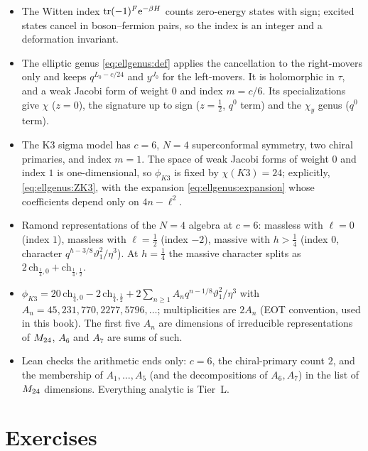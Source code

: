 \begin{summarybox}
\begin{itemize}[leftmargin=1.2em,itemsep=1pt]
\item The Witten index $\operatorname{tr}(-1)^F\mathrm{e}^{-\beta H}$ counts zero-energy states with sign; excited
 states cancel in boson--fermion pairs, so the index is an integer and a deformation
 invariant.
\item The elliptic genus \eqref{eq:ellgenus:def} applies the cancellation to the
 right-movers only and keeps $q^{L_0-c/24}$ and $y^{J_0}$ for the left-movers. It is
 holomorphic in $\tau$, and a weak Jacobi form of weight $0$ and index $m=c/6$. Its
 specializations give $\chi$ ($z=0$), the signature up to sign ($z=\tfrac12$, $q^0$ term) and
 the $\chi_y$ genus ($q^0$ term).
\item The K3 sigma model has $c=6$, $N=4$ superconformal symmetry, two chiral primaries, and
 index $m=1$. The space of weak Jacobi forms of weight $0$ and index $1$ is one-dimensional,
 so $\phi_{K3}$ is fixed by $\chi(K3)=24$; explicitly, \eqref{eq:ellgenus:ZK3}, with the
 expansion \eqref{eq:ellgenus:expansion} whose coefficients depend only on $4n-\ell^2$.
\item Ramond representations of the $N=4$ algebra at $c=6$: massless with $\ell=0$ (index
 $1$), massless with $\ell=\tfrac12$ (index $-2$), massive with $h>\tfrac14$ (index $0$,
 character $q^{h-3/8}\vartheta_1^2/\eta^3$). At $h=\tfrac14$ the massive character splits as
 $2\,\mathrm{ch}_{\frac14,0}+\mathrm{ch}_{\frac14,\frac12}$.
\item $\phi_{K3}=20\,\mathrm{ch}_{\frac14,0}-2\,\mathrm{ch}_{\frac14,\frac12}
 +2\sum_{n\ge1}A_nq^{n-1/8}\vartheta_1^2/\eta^3$ with $A_n=45,231,770,2277,5796,\dots$;
 multiplicities are $2A_n$ (EOT convention, used in this book). The first five $A_n$ are
 dimensions of irreducible representations of $M_{24}$, $A_6$ and $A_7$ are sums of such.
\item Lean checks the arithmetic ends only: $c=6$, the chiral-primary count $2$, and the
 membership of $A_1,\dots,A_5$ (and the decompositions of $A_6,A_7$) in the list of
 $M_{24}$ dimensions. Everything analytic is Tier~L.
\end{itemize}
\end{summarybox}

\section*{Exercises}


